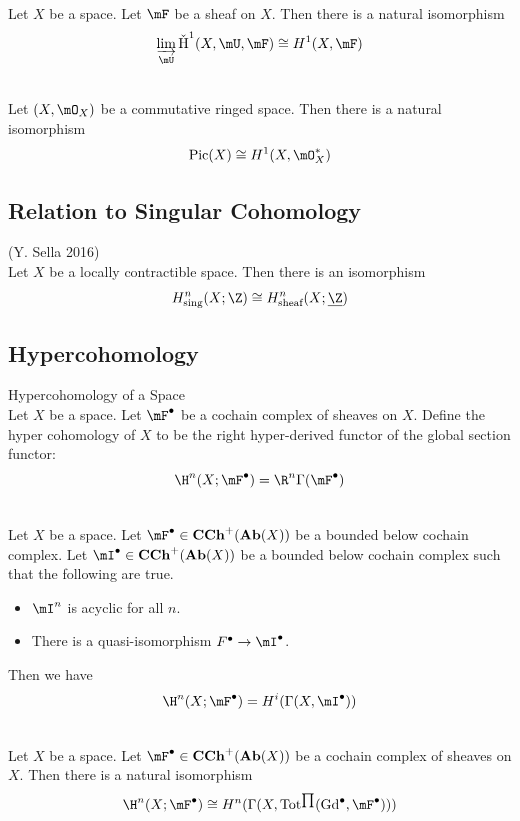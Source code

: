 \documentclass[a4paper]{article}
\begin{document}
\begin{prp}{}{}\\
Let $X$ be a space. Let $\mF$ be a sheaf on $X$. Then there is a natural isomorphism $$\varinjlim_{\mU}\text{\v{H}}^1(X,\mU,\mF)\cong H^1(X,\mF)$$
\end{prp}

\begin{prp}{}{}\\
Let $(X,\mO_X)$ be a commutative ringed space. Then there is a natural isomorphism $$\text{Pic}(X)\cong H^1(X,\mO_X^\ast)$$
\end{prp}

\subsection{Relation to Singular Cohomology}
\begin{thm}{(Y. Sella 2016)}{}\\
Let $X$ be a locally contractible space. Then there is an isomorphism $$H_\text{sing}^n(X;\Z)\cong H_\text{sheaf}^n(X;\underline{\Z})$$
\end{thm}

\subsection{Hypercohomology}
\begin{defn}{Hypercohomology of a Space}{}\\
Let $X$ be a space. Let $\mF^\bullet$ be a cochain complex of sheaves on $X$. Define the hyper cohomology of $X$ to be the right hyper-derived functor of the global section functor: $$\H^n(X;\mF^\bullet)=\R^n\Gamma(\mF^\bullet)$$
\end{defn}

\begin{prp}{}{}\\
Let $X$ be a space. Let $\mF^\bullet\in\bold{CCh}^+(\bold{Ab}(X))$ be a bounded below cochain complex. Let $\mI^\bullet\in\bold{CCh}^+(\bold{Ab}(X))$ be a bounded below cochain complex such that the following are true. 
\begin{itemize}
\item $\mI^n$ is acyclic for all $n$. 
\item There is a quasi-isomorphism $F^\bullet\to\mI^\bullet$. 
\end{itemize}
Then we have $$\H^n(X;\mF^\bullet)=H^i(\Gamma(X,\mI^\bullet))$$
\end{prp}

\begin{prp}{}{}\\
Let $X$ be a space. Let $\mF^\bullet\in\bold{CCh}^+(\bold{Ab}(X))$ be a cochain complex of sheaves on $X$. Then there is a natural isomorphism $$\H^n(X;\mF^\bullet)\cong H^n(\Gamma(X,\text{Tot}^{\prod}(\text{Gd}^\bullet,\mF^\bullet)))$$
\end{prp}
\end{document}

